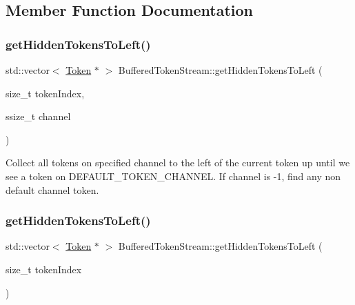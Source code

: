 \subsection{Member Function Documentation}
\mbox{\label{classantlr4_1_1BufferedTokenStream_ac43a075d6f0ecbda219eef4a9e4633ee}} 
\subsubsection{\texorpdfstring{get\+Hidden\+Tokens\+To\+Left()}{getHiddenTokensToLeft()}\hspace{0.1cm}{\footnotesize\ttfamily [1/2]}}
{\footnotesize\ttfamily std\+::vector$<$ \hyperlink{classantlr4_1_1Token}{Token} $\ast$ $>$ Buffered\+Token\+Stream\+::get\+Hidden\+Tokens\+To\+Left (\begin{DoxyParamCaption}\item[{size\+\_\+t}]{token\+Index,  }\item[{ssize\+\_\+t}]{channel }\end{DoxyParamCaption})\hspace{0.3cm}{\ttfamily [virtual]}}



Collect all tokens on specified channel to the left of the current token up until we see a token on D\+E\+F\+A\+U\+L\+T\+\_\+\+T\+O\+K\+E\+N\+\_\+\+C\+H\+A\+N\+N\+EL. If channel is -\/1, find any non default channel token. 

\mbox{\label{classantlr4_1_1BufferedTokenStream_aa6f2ca68abd8075329bba1da12970493}} 
\subsubsection{\texorpdfstring{get\+Hidden\+Tokens\+To\+Left()}{getHiddenTokensToLeft()}\hspace{0.1cm}{\footnotesize\ttfamily [2/2]}}
{\footnotesize\ttfamily std\+::vector$<$ \hyperlink{classantlr4_1_1Token}{Token} $\ast$ $>$ Buffered\+Token\+Stream\+::get\+Hidden\+Tokens\+To\+Left (\begin{DoxyParamCaption}\item[{size\+\_\+t}]{token\+Index }\end{DoxyParamCaption})\hspace{0.3cm}{\ttfamily [virtual]}}




